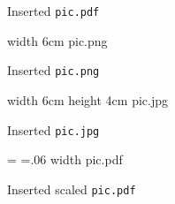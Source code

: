 \hbox{\pdfrefximage \pdflastximage}

\smallskip
Inserted {\tt pic.pdf}
\smallskip


\pdfximage width 6cm {pic.png}  %
\pdfrefximage \pdflastximage    %

\smallskip
Inserted {\tt pic.png}
\smallskip

\pdfximage width 6cm height 4cm %
   {pic.jpg}                    %
\pdfrefximage \pdflastximage

\smallskip
Inserted {\tt pic.jpg}

\smallskip    
{}          %
=\hbox{\pdfrefximage\pdflastximage} %
=.06         %
\pdfximage              %
    width  {pic.pdf}  %
\pdfrefximage \pdflastximage

\smallskip
Inserted scaled {\tt pic.pdf}

\newpage


